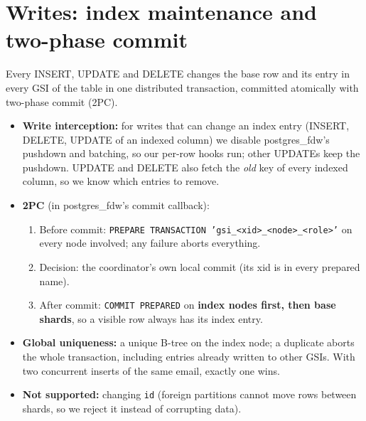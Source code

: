 \documentclass[11pt,a4paper]{article}
\begin{document}
\section{Writes: index maintenance and two-phase commit}
Every INSERT, UPDATE and DELETE changes the base row and its entry in every GSI of the table in one distributed
transaction, committed atomically with two-phase commit (2PC).
\begin{itemize}
  \item \textbf{Write interception:} for writes that can change an index entry (INSERT, DELETE,
        UPDATE of an indexed column) we disable postgres\_fdw's pushdown and batching, so our
        per-row hooks run; other UPDATEs keep the pushdown. UPDATE and DELETE also fetch the
        \emph{old} key of every indexed column, so we know which entries to remove.
  \item \textbf{2PC} (in postgres\_fdw's commit callback):
  \begin{enumerate}
    \item Before commit: \texttt{PREPARE TRANSACTION 'gsi\_<xid>\_<node>\_<role>'} on every node
          involved; any failure aborts everything.
    \item Decision: the coordinator's own local commit (its xid is in every prepared name).
    \item After commit: \texttt{COMMIT PREPARED} on \textbf{index nodes first, then base shards},
          so a visible row always has its index entry.
  \end{enumerate}
  \item \textbf{Global uniqueness:} a unique B-tree on the index node; a duplicate aborts the whole
        transaction, including entries already written to other GSIs. With two concurrent inserts of the same email, exactly one wins.
  \item \textbf{Not supported:} changing \texttt{id} (foreign partitions cannot move rows between
        shards, so we reject it instead of corrupting data).
\end{itemize}
\end{document}
